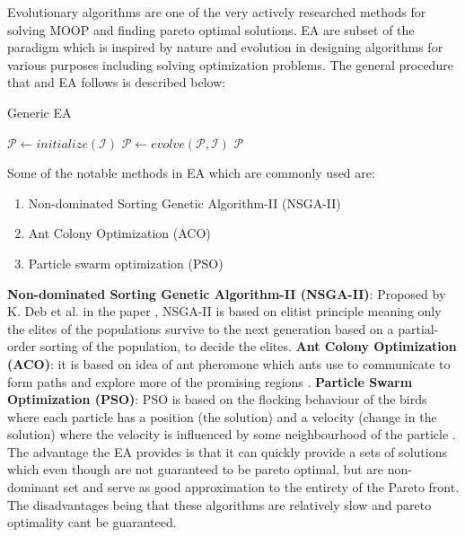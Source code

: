 Evolutionary algorithms are one of the very actively researched methods \cite{vikhar2016evolutionary} for solving MOOP and finding pareto optimal solutions. EA are subset of the paradigm which is inspired by nature and evolution in designing algorithms for various purposes including solving optimization problems. The general procedure that and EA follows is described below:
\begin{algorithm}
\caption{Generic EA}\label{algo_generic_ea}
\begin{algorithmic}
 
    \State $\mathcal{P} \gets initialize(\mathcal{I})$ 
     
        \State $\mathcal{P} \gets evolve(\mathcal{P},\mathcal{I})$ 
    \EndWhile
    \Return $\mathcal{P}$
\EndFunction
\end{algorithmic}
\end{algorithm}\newline Some of the notable methods in EA which are commonly used are:
\begin{enumerate}
    \item Non-dominated Sorting Genetic Algorithm-II (NSGA-II)
    \item Ant Colony Optimization (ACO)
    \item Particle swarm optimization (PSO)
\end{enumerate} 
\textbf{Non-dominated Sorting Genetic Algorithm-II (NSGA-II)}: \label{nsga_2} Proposed by K. Deb et al. in the paper \cite{deb2002fast}, NSGA-II is based on elitist principle meaning only the elites of the populations survive to the next generation based on a partial-order sorting of the population, to decide the elites.
\newline\newline \textbf{Ant Colony Optimization (ACO)}: \label{ant_colony_opt} it is based on idea of ant pheromone which ants use to communicate to form paths and explore more of the promising regions \cite{slowik2017nature}.
\newline\newline \textbf{Particle Swarm Optimization (PSO)}: \label{partical_swarm_opt} PSO is based on the flocking behaviour of the birds where each particle has a position (the solution) and a velocity (change in the solution) where the velocity is influenced by some neighbourhood of the particle \cite{poli2007particle}.
\newline\newline The advantage the EA provides is that it can quickly provide a sets of solutions which even though are not guaranteed to be pareto optimal, but are non-dominant set and serve as good approximation to the entirety of the Pareto front. The disadvantages being that these algorithms are relatively slow and pareto optimality cant be guaranteed.

